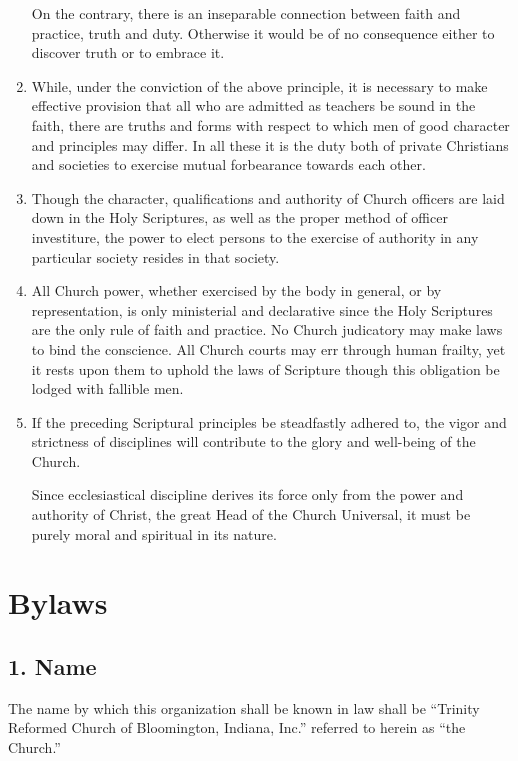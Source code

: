 \documentclass[
]{book}
\begin{document}
\begin{enumerate}
  On the contrary, there is an inseparable connection between faith and practice, truth and duty. Otherwise it would be of no consequence either to discover truth or to embrace it.
\item
  While, under the conviction of the above principle, it is necessary to make effective provision that all who are admitted as teachers be sound in the faith, there are truths and forms with respect to which men of good character and principles may differ. In all these it is the duty both of private Christians and societies to exercise mutual forbearance towards each other.
\item
  Though the character, qualifications and authority of Church officers are laid down in the Holy Scriptures, as well as the proper method of officer investiture, the power to elect persons to the exercise of authority in any particular society resides in that society.
\item
  All Church power, whether exercised by the body in general, or by representation, is only ministerial and declarative since the Holy Scriptures are the only rule of faith and practice. No Church judicatory may make laws to bind the conscience. All Church courts may err through human frailty, yet it rests upon them to uphold the laws of Scripture though this obligation be lodged with fallible men.
\item
  If the preceding Scriptural principles be steadfastly adhered to, the vigor and strictness of disciplines will contribute to the glory and well-being of the Church.

  Since ecclesiastical discipline derives its force only from the power and authority of Christ, the great Head of the Church Universal, it must be purely moral and spiritual in its nature.
\end{enumerate}

\hypertarget{bylaws}{%
\chapter{Bylaws}\label{bylaws}}

\hypertarget{name}{%
\section{1. Name}\label{name}}

The name by which this organization shall be known in law shall be ``Trinity Reformed Church of Bloomington, Indiana, Inc.'' referred to herein as ``the Church.''
\end{document}
